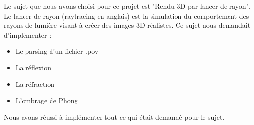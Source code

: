 Le sujet que nous avons choisi pour ce projet est "Rendu 3D par lancer de rayon".
Le lancer de rayon (raytracing en anglais) est la simulation du comportement des rayons de lumière visant à créer des images 3D réalistes.
Ce sujet nous demandait d'implémenter :
\begin{itemize}
    \item Le parsing d'un fichier .pov
    \item La réflexion
    \item La réfraction
    \item L'ombrage de Phong
\end{itemize}
Nous avons réussi à implémenter tout ce qui était demandé pour le sujet.
